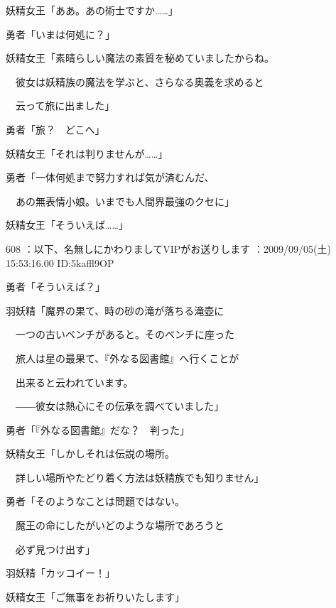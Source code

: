 \documentclass[a4j,twocolumn]{tarticle}
\begin{document}
妖精女王「ああ。あの術士ですか……」\par{} 
勇者「いまは何処に？」 



妖精女王「素晴らしい魔法の素質を秘めていましたからね。\par{} 
　彼女は妖精族の魔法を学ぶと、さらなる奥義を求めると\par{} 
　云って旅に出ました」 



勇者「旅？　どこへ」 



妖精女王「それは判りませんが……」 



勇者「一体何処まで努力すれば気が済むんだ、\par{} 
　あの無表情小娘。いまでも人間界最強のクセに」 



妖精女王「そういえば……」 

	
    
    

608 ：以下、名無しにかわりましてVIPがお送りします ：2009/09/05(土) 15:53:16.00 ID:5kaffl9OP 


勇者「そういえば？」\par{} 
羽妖精「魔界の果て、時の砂の滝が落ちる滝壺に\par{} 
　一つの古いベンチがあると。そのベンチに座った\par{}
　旅人は星の最果て、『外なる図書館』へ行くことが\par{} 
　出来ると云われています。\par{} 
　――彼女は熱心にその伝承を調べていました」 



勇者「『外なる図書館』だな？　判った」 



妖精女王「しかしそれは伝説の場所。\par{} 
　詳しい場所やたどり着く方法は妖精族でも知りません」 



勇者「そのようなことは問題ではない。\par{} 
　魔王の命にしたがいどのような場所であろうと\par{} 
　必ず見つけ出す」 



羽妖精「カッコイー！」 



妖精女王「ご無事をお祈りいたします」 
\end{document}
